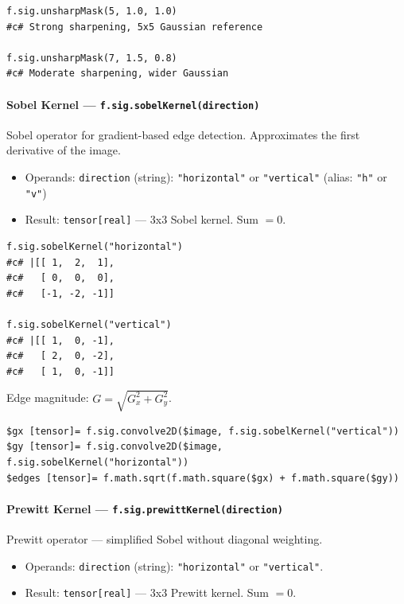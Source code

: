 \begin{verbatim}
f.sig.unsharpMask(5, 1.0, 1.0)
#c# Strong sharpening, 5x5 Gaussian reference

f.sig.unsharpMask(7, 1.5, 0.8)
#c# Moderate sharpening, wider Gaussian
\end{verbatim}

\paragraph{Sobel Kernel --- \texttt{f.sig.sobelKernel(direction)}}

Sobel operator for gradient-based edge detection. Approximates the first derivative of the image.

\begin{itemize}
\item Operands: \texttt{direction} (string): \texttt{"horizontal"} or \texttt{"vertical"} (alias: \texttt{"h"} or \texttt{"v"})
\item Result: \texttt{tensor[real]} --- 3x3 Sobel kernel. Sum $= 0$.
\end{itemize}

\begin{verbatim}
f.sig.sobelKernel("horizontal")
#c# |[[ 1,  2,  1],
#c#   [ 0,  0,  0],
#c#   [-1, -2, -1]]

f.sig.sobelKernel("vertical")
#c# |[[ 1,  0, -1],
#c#   [ 2,  0, -2],
#c#   [ 1,  0, -1]]
\end{verbatim}

Edge magnitude: $G = \sqrt{G_x^2 + G_y^2}$.

\begin{verbatim}
$gx [tensor]= f.sig.convolve2D($image, f.sig.sobelKernel("vertical"))
$gy [tensor]= f.sig.convolve2D($image, f.sig.sobelKernel("horizontal"))
$edges [tensor]= f.math.sqrt(f.math.square($gx) + f.math.square($gy))
\end{verbatim}

\paragraph{Prewitt Kernel --- \texttt{f.sig.prewittKernel(direction)}}

Prewitt operator --- simplified Sobel without diagonal weighting.

\begin{itemize}
\item Operands: \texttt{direction} (string): \texttt{"horizontal"} or \texttt{"vertical"}.
\item Result: \texttt{tensor[real]} --- 3x3 Prewitt kernel. Sum $= 0$.
\end{itemize}


